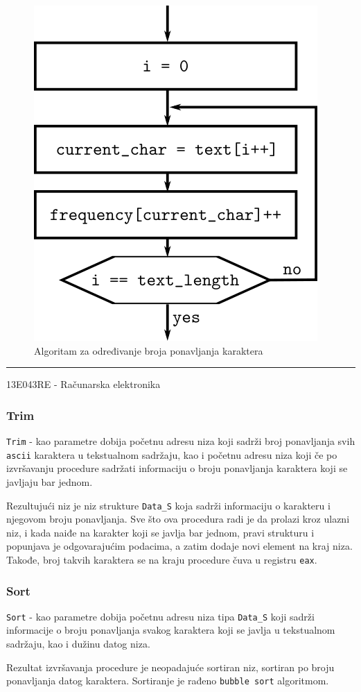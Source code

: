 \documentclass[a4paper, 12pt]{article}
\newcommand{\btmline}{
\vfill
\rule{0.9\textwidth}{0.4mm}
\begin{center}
13E043RE - Računarska elektronika
\end{center}}
\begin{document}
\begin{figure}[h!]
\centering
\includegraphics[width=.35\textwidth]{count}
\caption{Algoritam za određivanje broja ponavljanja karaktera}
\label{count}
\end{figure}

\btmline\newpage

\subsubsection*{\textsf{Trim}}

\verb|Trim| - kao parametre dobija početnu adresu niza koji sadrži broj ponavljanja svih \verb|ascii| karaktera u tekstualnom sadržaju, kao i početnu adresu niza koji če po izvršavanju procedure sadržati informaciju o broju ponavljanja karaktera koji se javljaju bar jednom.

Rezultujući niz je niz strukture \verb|Data_S| koja sadrži informaciju o karakteru i njegovom broju ponavljanja. Sve što ova procedura radi je da prolazi kroz ulazni niz, i kada naiđe na karakter koji se javlja bar jednom, pravi strukturu i popunjava je odgovarajućim podacima, a zatim dodaje novi element na kraj niza. Takođe, broj takvih karaktera se na kraju procedure čuva u registru \verb|eax|.

\subsubsection*{\textsf{Sort}}

\verb|Sort| - kao parametre dobija početnu adresu niza tipa \verb|Data_S| koji sadrži informacije o broju ponavljanja svakog karaktera koji se javlja u tekstualnom sadržaju, kao i dužinu datog niza.

Rezultat izvršavanja procedure je neopadajuće sortiran niz, sortiran po broju ponavljanja datog karaktera. Sortiranje je rađeno \verb|bubble sort| algoritmom.
\end{document}
